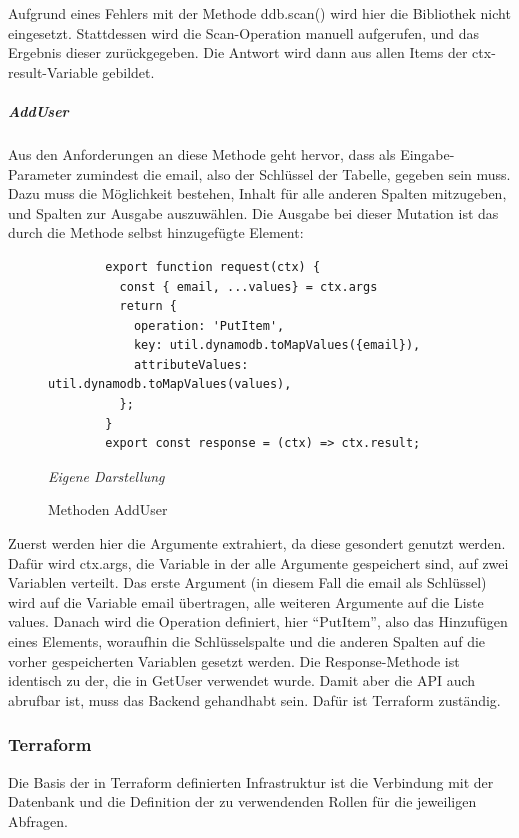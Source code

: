 	Aufgrund eines Fehlers mit der Methode ddb.scan() wird hier die Bibliothek nicht eingesetzt. Stattdessen wird die Scan-Operation manuell aufgerufen, und das Ergebnis dieser zurückgegeben. Die Antwort wird dann aus allen Items der ctx-result-Variable gebildet.
	\subparagraph {AddUser}
	Aus den Anforderungen an diese Methode geht hervor, dass als Eingabe-Parameter zumindest die email, also der Schlüssel der Tabelle, gegeben sein muss. Dazu muss die Möglichkeit bestehen, Inhalt für alle anderen Spalten mitzugeben, und Spalten zur Ausgabe auszuwählen. Die Ausgabe bei dieser Mutation ist das durch die Methode selbst hinzugefügte Element:
		\begin{figure}[H]
		\centering
		\begin{minipage}[t]{.7\textwidth} %
		\caption{Methoden AddUser} %
		\begin{verbatim}
		export function request(ctx) {
		  const { email, ...values} = ctx.args
		  return {
		    operation: 'PutItem',
		    key: util.dynamodb.toMapValues({email}),
		    attributeValues: util.dynamodb.toMapValues(values),
		  };
		}
		export const response = (ctx) => ctx.result;
		\end{verbatim}
		
		\textit{Eigene Darstellung} %
		\label{fig:addUserMethoden}
		\end{minipage}
		\end{figure}
	Zuerst werden hier die Argumente extrahiert, da diese gesondert genutzt werden. Dafür wird ctx.args, die Variable in der alle Argumente gespeichert sind, auf zwei Variablen verteilt. Das erste Argument (in diesem Fall die email als Schlüssel) wird auf die Variable email übertragen, alle weiteren Argumente auf die Liste values. Danach wird die Operation definiert, hier ``PutItem'', also das Hinzufügen eines Elements, woraufhin die Schlüsselspalte und die anderen Spalten auf die vorher gespeicherten Variablen gesetzt werden. Die Response-Methode ist identisch zu der, die in GetUser verwendet wurde.\newline
	Damit aber die API auch abrufbar ist, muss das Backend gehandhabt sein. Dafür ist Terraform zuständig.
	\subsubsection{Terraform}
	Die Basis der in Terraform definierten Infrastruktur ist die Verbindung mit der Datenbank und die Definition der zu verwendenden Rollen für die jeweiligen Abfragen. 
